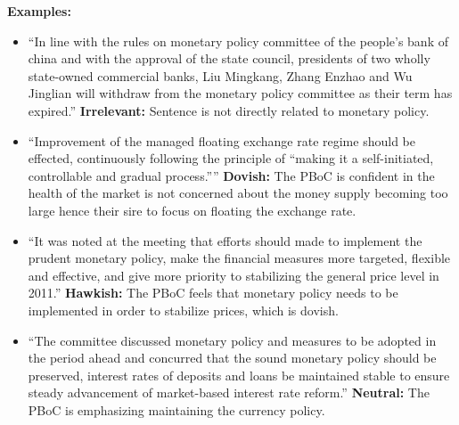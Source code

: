\textbf{Examples:}
\begin{itemize}
    \item ``In line with the rules on monetary policy committee of the people's bank of china and with the approval of the state council, presidents of two wholly state-owned commercial banks, Liu Mingkang, Zhang Enzhao and Wu Jinglian will withdraw from the monetary policy committee as their term has expired.''
    \newline\textbf{Irrelevant:} Sentence is not directly related to monetary policy. 
    \item ``Improvement of the managed floating exchange rate regime should be effected, continuously following the principle of “making it a self-initiated, controllable and gradual process.''''
    \newline\textbf{Dovish: } The PBoC is confident in the health of the market is not concerned about the money supply becoming too large hence their sire to focus on floating the exchange rate.
    \item ``It was noted at the meeting that efforts should made to implement the prudent monetary policy, make the financial measures more targeted, flexible and effective, and give more priority to stabilizing the general price level in 2011.''
    \newline\textbf{Hawkish: }The PBoC feels that monetary policy needs to be implemented in order to stabilize prices, which is dovish. 
    \item ``The committee discussed monetary policy and measures to be adopted in the period ahead and concurred that the sound monetary policy should be preserved, interest rates of deposits and loans be maintained stable to ensure steady advancement of market-based interest rate reform.''
    \newline\textbf{Neutral: }The PBoC is emphasizing maintaining the currency policy.

\end{itemize}

\newpage

